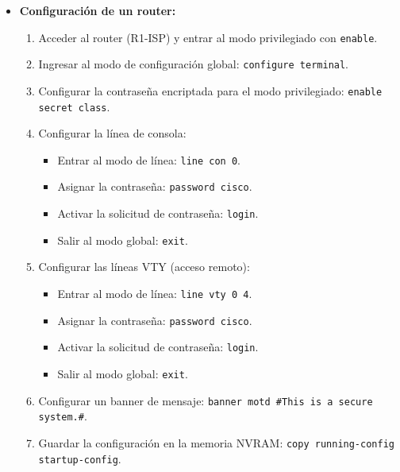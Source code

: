\documentclass[a4paper,11pt]{article}
\begin{document}
\begin{itemize}
    \item \textbf{Configuración de un router:}
          \begin{enumerate}
              \item Acceder al router (R1-ISP) y entrar al modo privilegiado con \texttt{enable}.
              \item Ingresar al modo de configuración global: \texttt{configure terminal}.
              \item Configurar la contraseña encriptada para el modo privilegiado: \texttt{enable
                        secret class}.
              \item Configurar la línea de consola:
                    \begin{itemize}
                        \item Entrar al modo de línea: \texttt{line con 0}.
                        \item Asignar la contraseña: \texttt{password cisco}.
                        \item Activar la solicitud de contraseña: \texttt{login}.
                        \item Salir al modo global: \texttt{exit}.
                    \end{itemize}
              \item Configurar las líneas VTY (acceso remoto):
                    \begin{itemize}
                        \item Entrar al modo de línea: \texttt{line vty 0 4}.
                        \item Asignar la contraseña: \texttt{password cisco}.
                        \item Activar la solicitud de contraseña: \texttt{login}.
                        \item Salir al modo global: \texttt{exit}.
                    \end{itemize}
              \item Configurar un banner de mensaje: \texttt{banner motd \#This is a secure
                        system.\#}.
              \item Guardar la configuración en la memoria NVRAM: \texttt{copy running-config
                        startup-config}.
          \end{enumerate}
          \vspace{0.5cm}


\end{itemize}
\end{document}

